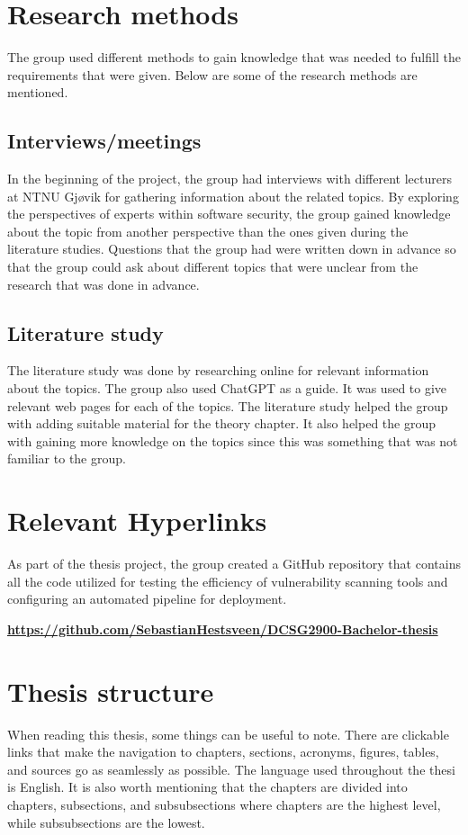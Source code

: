 \newpage
\section{Research methods}
The group used different methods to gain knowledge that was needed to fulfill the requirements that were given. Below are some of the research methods are mentioned. 

\subsection{Interviews/meetings}
In the beginning of the project, the group had interviews with different lecturers at NTNU Gjøvik for gathering information about the related topics. By exploring the perspectives of experts within software security, the group gained knowledge about the topic from another perspective than the ones given during the literature studies. Questions that the group had were written down in advance so that the group could ask about different topics that were unclear from the research that was done in advance.   

\subsection{Literature study}
The literature study was done by researching online for relevant information about the topics. The group also used ChatGPT as a guide. It was used to give relevant web pages for each of the topics. The literature study helped the group with adding suitable material for the theory chapter. It also helped the group with gaining more knowledge on the topics since this was something that was not familiar to the group. 

\section{Relevant Hyperlinks}
As part of the thesis project, the group created a GitHub repository that contains all the code utilized for testing the efficiency of vulnerability scanning tools and configuring an automated pipeline for deployment. 

\href{https://github.com/SebastianHestsveen/DCSG2900-Bachelor-thesis}{\textbf{https://github.com/SebastianHestsveen/DCSG2900-Bachelor-thesis}}

\section{Thesis structure}
When reading this thesis, some things can be useful to note. There are clickable links that make the navigation to chapters, sections, acronyms, figures, tables, and sources go as seamlessly as possible. The language used throughout the thesi is English. It is also worth mentioning that the chapters are divided into chapters, subsections, and subsubsections where chapters are the highest level, while subsubsections are the lowest. 

